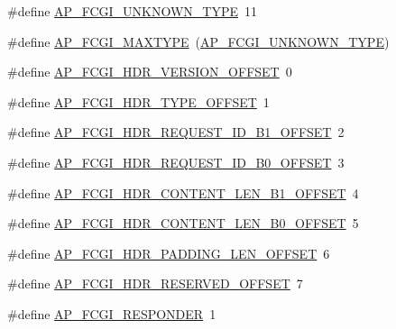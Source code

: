 \begin{DoxyCompactItemize}
\item 
\#define \hyperlink{group__APACHE__CORE__FASTCGI_gae972a36462c8ac75b0c6a63557b8106f}{A\+P\+\_\+\+F\+C\+G\+I\+\_\+\+U\+N\+K\+N\+O\+W\+N\+\_\+\+T\+Y\+PE}~11
\item 
\#define \hyperlink{group__APACHE__CORE__FASTCGI_ga8242fcba6c5dceb1d1780851f2ef613c}{A\+P\+\_\+\+F\+C\+G\+I\+\_\+\+M\+A\+X\+T\+Y\+PE}~(\hyperlink{group__APACHE__CORE__FASTCGI_gae972a36462c8ac75b0c6a63557b8106f}{A\+P\+\_\+\+F\+C\+G\+I\+\_\+\+U\+N\+K\+N\+O\+W\+N\+\_\+\+T\+Y\+PE})
\item 
\#define \hyperlink{group__APACHE__CORE__FASTCGI_ga7b3eb53cfcdb65eabf18beae9761a4e1}{A\+P\+\_\+\+F\+C\+G\+I\+\_\+\+H\+D\+R\+\_\+\+V\+E\+R\+S\+I\+O\+N\+\_\+\+O\+F\+F\+S\+ET}~0
\item 
\#define \hyperlink{group__APACHE__CORE__FASTCGI_ga70ac0a1cc6ba751b48de730a8735dd29}{A\+P\+\_\+\+F\+C\+G\+I\+\_\+\+H\+D\+R\+\_\+\+T\+Y\+P\+E\+\_\+\+O\+F\+F\+S\+ET}~1
\item 
\#define \hyperlink{group__APACHE__CORE__FASTCGI_ga2cb82ad276afb5bc4cb180886efeb61e}{A\+P\+\_\+\+F\+C\+G\+I\+\_\+\+H\+D\+R\+\_\+\+R\+E\+Q\+U\+E\+S\+T\+\_\+\+I\+D\+\_\+\+B1\+\_\+\+O\+F\+F\+S\+ET}~2
\item 
\#define \hyperlink{group__APACHE__CORE__FASTCGI_ga52c054dc2f8d87bcd21aa0cd667b643c}{A\+P\+\_\+\+F\+C\+G\+I\+\_\+\+H\+D\+R\+\_\+\+R\+E\+Q\+U\+E\+S\+T\+\_\+\+I\+D\+\_\+\+B0\+\_\+\+O\+F\+F\+S\+ET}~3
\item 
\#define \hyperlink{group__APACHE__CORE__FASTCGI_gaed7134f04bde4aa2e002a426826cbdd3}{A\+P\+\_\+\+F\+C\+G\+I\+\_\+\+H\+D\+R\+\_\+\+C\+O\+N\+T\+E\+N\+T\+\_\+\+L\+E\+N\+\_\+\+B1\+\_\+\+O\+F\+F\+S\+ET}~4
\item 
\#define \hyperlink{group__APACHE__CORE__FASTCGI_ga16a60d940d0b62cb5d2c7ac4aca95402}{A\+P\+\_\+\+F\+C\+G\+I\+\_\+\+H\+D\+R\+\_\+\+C\+O\+N\+T\+E\+N\+T\+\_\+\+L\+E\+N\+\_\+\+B0\+\_\+\+O\+F\+F\+S\+ET}~5
\item 
\#define \hyperlink{group__APACHE__CORE__FASTCGI_gae49ac0e67325bafbfaaad2596e3651cb}{A\+P\+\_\+\+F\+C\+G\+I\+\_\+\+H\+D\+R\+\_\+\+P\+A\+D\+D\+I\+N\+G\+\_\+\+L\+E\+N\+\_\+\+O\+F\+F\+S\+ET}~6
\item 
\#define \hyperlink{group__APACHE__CORE__FASTCGI_ga117bdfb3283fdf5b8250779dd30fa4af}{A\+P\+\_\+\+F\+C\+G\+I\+\_\+\+H\+D\+R\+\_\+\+R\+E\+S\+E\+R\+V\+E\+D\+\_\+\+O\+F\+F\+S\+ET}~7
\item 
\#define \hyperlink{group__APACHE__CORE__FASTCGI_gaaf3982b83abf0203172d7e81ace758d9}{A\+P\+\_\+\+F\+C\+G\+I\+\_\+\+R\+E\+S\+P\+O\+N\+D\+ER}~1
\item 

\end{DoxyCompactItemize}
